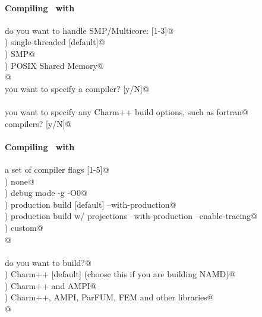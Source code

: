 
\begin{frame}[fragile] 
\secframetitle{\ssInstallCharm}
\framesubtitle{Compiling \charm\ with }
\color{black}
\footnotesize

\verb@How do you want to handle SMP/Multicore: [1-3]@ \\
) single-threaded [default]@ \\
) SMP@ \\
) POSIX Shared Memory@ \\
\verb@  @
\pause
\ \\
\verb@Do you want to specify a compiler? [y/N]@\pause\verb@n@ \\
\ \\
\verb@Do you want to specify any Charm++ build options, such as fortran@ \\
\verb@   compilers? [y/N]@ \\

\end{frame}


\begin{frame}[fragile] 
\secframetitle{\ssInstallCharm}
\framesubtitle{Compiling \charm\ with }
\color{black}
\footnotesize

\verb@Choose a set of compiler flags [1-5]@ \\
) none@ \\
) debug mode                      -g -O0@ \\
) production build [default]      --with-production@ \\
) production build w/ projections --with-production --enable-tracing@ \\
) custom@ \\
\verb@  @
\pause
\ \\ \ \\
\verb@What do you want to build?@ \\
) Charm++ [default] (choose this if you are building NAMD)@ \\
) Charm++ and AMPI@ \\
) Charm++, AMPI, ParFUM, FEM and other libraries@ \\
\verb@  @
\end{frame}


